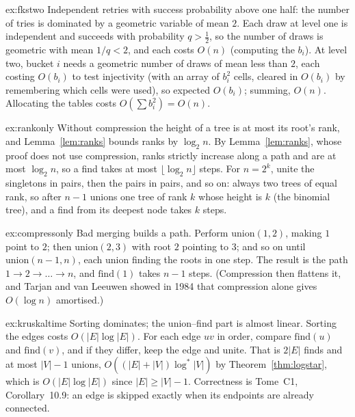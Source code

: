 \begin{solution}{ex:fkstwo}
\idea Independent retries with success probability above one half: the number of tries is dominated by a geometric variable of mean $2$.
\writeup Each draw at level one is independent and succeeds with probability $q>\frac12$, so the number of draws is geometric with mean $1/q<2$, and each costs $O(n)$ (computing the $b_i$).
At level two, bucket $i$ needs a geometric number of draws of mean less than $2$, each costing $O(b_i)$ to test injectivity (with an array of $b_i^2$ cells, cleared in $O(b_i)$ by remembering
which cells were used), so expected $O(b_i)$; summing, $O(n)$. Allocating the tables costs $O(\sum b_i^2)=O(n)$.
\end{solution}

\begin{solution}{ex:rankonly}
\idea Without compression the height of a tree is at most its root's rank, and Lemma~\ref{lem:ranks} bounds ranks by $\log_2n$.
\writeup By Lemma~\ref{lem:ranks}, whose proof does not use compression, ranks strictly increase along a path and are at most $\log_2n$, so a find takes at most
$\lfloor\log_2n\rfloor$ steps. For $n=2^k$, unite the singletons in pairs, then the pairs in pairs, and so on: always two trees of equal rank, so after $n-1$ unions one tree of rank $k$
whose height is $k$ (the binomial tree), and a find from its deepest node takes $k$ steps.
\end{solution}

\begin{solution}{ex:compressonly}
\idea Bad merging builds a path.
\writeup Perform $\mathrm{union}(1,2)$, making $1$ point to $2$; then $\mathrm{union}(2,3)$ with root $2$ pointing to $3$; and so on until $\mathrm{union}(n-1,n)$, each union finding the roots in one
step. The result is the path $1\to2\to\dots\to n$, and $\mathrm{find}(1)$ takes $n-1$ steps. (Compression then flattens it, and Tarjan and van Leeuwen showed in 1984 that compression alone
gives $O(\log n)$ amortised.)
\end{solution}

\begin{solution}{ex:kruskaltime}
\idea Sorting dominates; the union--find part is almost linear.
\writeup Sorting the edges costs $O(|E|\log|E|)$. For each edge $uv$ in order, compare $\mathrm{find}(u)$ and $\mathrm{find}(v)$, and if they differ, keep the edge and unite. That is $2|E|$ finds and at
most $|V|-1$ unions, $O((|E|+|V|)\log^*|V|)$ by Theorem~\ref{thm:logstar}, which is $O(|E|\log|E|)$ since $|E|\ge|V|-1$. Correctness is Tome~C1, Corollary~10.9: an edge is skipped exactly when its
endpoints are already connected.
\end{solution}


